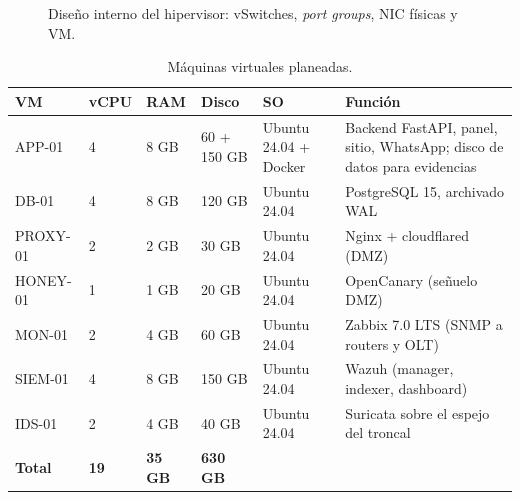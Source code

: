 \begin{figure}[H]
\caption{Diseño interno del hipervisor: vSwitches, \emph{port groups}, NIC físicas y VM.}
\label{fig:ce03-esxi}
\end{figure}

\begin{table}[htbp]
\centering
\caption{Máquinas virtuales planeadas.}
\label{tab:ce03-vms}
\small
\begin{tabularx}{\textwidth}{L{1.9cm}C{0.9cm}C{1cm}L{2.1cm}L{2.4cm}X}
\toprule
\textbf{VM} & \textbf{vCPU} & \textbf{RAM} & \textbf{Disco} & \textbf{SO} & \textbf{Función} \\
\midrule
APP-01 & 4 & 8 GB & 60 + 150 GB & Ubuntu 24.04 + Docker & Backend FastAPI, panel, sitio, WhatsApp; disco de datos para evidencias \\
DB-01 & 4 & 8 GB & 120 GB & Ubuntu 24.04 & PostgreSQL 15, archivado WAL \\
PROXY-01 & 2 & 2 GB & 30 GB & Ubuntu 24.04 & Nginx + cloudflared (DMZ) \\
HONEY-01 & 1 & 1 GB & 20 GB & Ubuntu 24.04 & OpenCanary (señuelo DMZ) \\
MON-01 & 2 & 4 GB & 60 GB & Ubuntu 24.04 & Zabbix 7.0 LTS (SNMP a routers y OLT) \\
SIEM-01 & 4 & 8 GB & 150 GB & Ubuntu 24.04 & Wazuh (manager, indexer, dashboard) \\
IDS-01 & 2 & 4 GB & 40 GB & Ubuntu 24.04 & Suricata sobre el espejo del troncal \\
\midrule
\textbf{Total} & \textbf{19} & \textbf{35 GB} & \textbf{630 GB} & & \\
\bottomrule
\end{tabularx}
\end{table}

